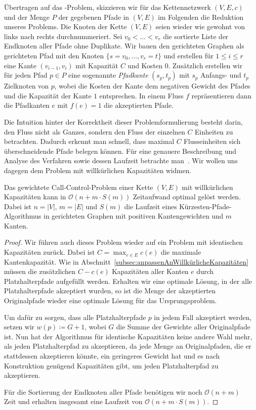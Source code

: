 Übertragen auf das \WeightedCallControl-Problem, skizzieren wir für das Kettennetzwerk $(V,E,c)$
und der Menge $P$ der gegebenen Pfade in $(V,E)$ im Folgenden die Reduktion unseres Problems.
Die Knoten der Kette $(V,E)$ seien wieder wie gewohnt von links nach rechts durchnummeriert.
Sei $v_0 < \dots < v_r$ die sortierte Liste der Endknoten aller Pfade ohne Duplikate.
Wir bauen den gerichteten Graphen als gerichteten Pfad mit den Knoten $\{s = v_0, \dots, v_r=t\}$ und erstellen
für $1 \leq i \leq r$ eine Kante $(v_{i-1}, v_i)$ mit Kapazität $C$ und Kosten $0$.
Zusätzlich erstellen wir für jeden Pfad $p \in P$ eine sogenannte {\em Pfadkante} $(s_p, t_p)$ mit $s_p$ Anfangs- und $t_p$ Zielknoten von $p$,
wobei die Kosten der Kante dem negativen Gewicht des Pfades und die Kapazität der Kante $1$ entsprechen.
In einem Fluss $f$ repräsentieren dann die Pfadkanten $e$ mit $f(e)=1$ die akzeptierten Pfade.

Die Intuition hinter der Korrektheit dieser Problemformulierung besteht darin, den Fluss nicht als Ganzes, sondern
den Fluss der einzelnen $C$ Einheiten zu betrachten.
Dadurch erkennt man schnell, dass maximal $C$ Flusseinheiten sich überschneidende Pfade belegen können.
Für eine genauere Beschreibung und Analyse des Verfahren sowie dessen Laufzeit betrachte man~\cite{carlisle}.
Wir wollen uns dagegen dem Problem mit willkürlichen Kapazitäten widmen.

\begin{theorem}
    Das gewichtete Call-Control-Problem einer Kette $(V, E)$ mit willkürlichen Kapazitäten kann in $\mathcal O(n + m\cdot S(m))$
    Zeitaufwand optimal gelöst werden.
    Dabei ist $n = |V|$, $m=|E|$ und $S(m)$ die Laufzeit eines Kürzesten-Pfade-Algorithmus in gerichteten Graphen mit
    positiven Kantengewichten und $m$ Kanten.
\end{theorem}
\begin{proof}
    Wir führen auch dieses Problem wieder auf ein Problem mit identischen Kapazitäten zurück.
    Dabei ist $C = \max_{e \in E}c(e)$ die maximale Kantenkapazität.
    Wie in Abschnitt~\ref{subsec:anpassenAnWillkürlicheKapazitäten} müssen die zusätzlichen $C - c(e)$ Kapazitäten
    aller Kanten $e$ durch Platzhalterpfade aufgefüllt werden.
    Erhalten wir eine optimale Lösung, in der alle Platzhalterpfade akzeptiert wurden, so ist die Menge der akzeptierten
    Originalpfade wieder eine optimale Lösung für das Ursprungsproblem.

    Um dafür zu sorgen, dass alle Platzhalterpfade $p$ in jedem Fall akzeptiert werden, setzen wir
    $w(p) \coloneqq G + 1$, wobei $G$ die Summe der Gewichte aller Originalpfade ist.
    Nun hat der Algorithmus für identische Kapazitäten keine andere Wahl mehr, als jeden Platzhalterpfad zu akzeptieren,
    da jede Menge an Originalpfaden, die er stattdessen akzeptieren könnte, ein geringeres Gewicht hat und es nach
    Konstruktion genügend Kapazitäten gibt, um jeden Platzhalterpfad zu akzeptieren.

    Für die Sortierung der Endknoten aller Pfade benötigen wir noch $\mathcal O(n+m)$ Zeit und erhalten insgesamt eine Laufzeit
    von $\mathcal O(n+m\cdot S(m))$.
\end{proof}

